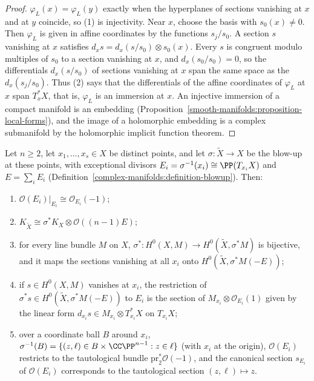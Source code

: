 \begin{proof}
$\varphi_L(x) = \varphi_L(y)$ exactly when the hyperplanes of sections vanishing at $x$ and at $y$ coincide, so (1) is injectivity. Near $x$, choose
the basis with $s_0(x) \neq 0$. Then $\varphi_L$ is given in affine coordinates by the functions $s_j/s_0$. A section $s$ vanishing at $x$ satisfies
$d_xs = d_x(s/s_0) \otimes s_0(x)$. Every $s$ is congruent modulo multiples of $s_0$ to a section vanishing at $x$, and $d_x(s_0/s_0) = 0$, so the
differentials $d_x(s/s_0)$ of sections vanishing at $x$ span the same space as the $d_x(s_j/s_0)$. Thus (2) says that the differentials of the
affine coordinates of $\varphi_L$ at $x$ span $T^*_xX$, that is, $\varphi_L$ is an immersion at $x$. An
injective immersion of a compact manifold is an embedding (Proposition~\ref{smooth-manifolds:proposition-local-forms}), and the image of a
holomorphic embedding is a complex submanifold by the holomorphic implicit function theorem.
\end{proof}

\begin{lemma}\label{kodaira:lemma-blowup-facts}
Let $n \geq 2$, let $x_1, \ldots, x_s \in X$ be distinct points, and let $\sigma \colon \tilde X \to X$ be the blow-up at these points, with
exceptional divisors $E_i = \sigma^{-1}(x_i) \cong \PP(T_{x_i}X)$ and $E = \sum_iE_i$ (Definition~\ref{complex-manifolds:definition-blowup}). Then:
\begin{enumerate}
\item $\mathcal{O}(E_i)|_{E_i} \cong \mathcal{O}_{E_i}(-1)$;
\item $K_{\tilde X} \cong \sigma^*K_X \otimes \mathcal{O}((n-1)E)$;
\item for every line bundle $M$ on $X$, $\sigma^* \colon H^0(X, M) \to H^0(\tilde X, \sigma^*M)$ is bijective, and it maps the sections vanishing
at all $x_i$ onto $H^0(\tilde X, \sigma^*M(-E))$;
\item if $s \in H^0(X, M)$ vanishes at $x_i$, the restriction of $\sigma^*s \in H^0(\tilde X, \sigma^*M(-E))$ to $E_i$ is the section of
$M_{x_i} \otimes \mathcal{O}_{E_i}(1)$ given by the linear form $d_{x_i}s \in M_{x_i} \otimes T^*_{x_i}X$ on $T_{x_i}X$;
\item over a coordinate ball $B$ around $x_i$, $\sigma^{-1}(B) = \{(z, \ell) \in B \times \CC\PP^{n-1} : z \in \ell\}$ (with $x_i$ at the origin),
$\mathcal{O}(E_i)$ restricts to the tautological bundle $\mathrm{pr}_2^*\mathcal{O}(-1)$, and the canonical section $s_{E_i}$ of $\mathcal{O}(E_i)$
corresponds to the tautological section $(z, \ell) \mapsto z$.
\end{enumerate}
\end{lemma}

